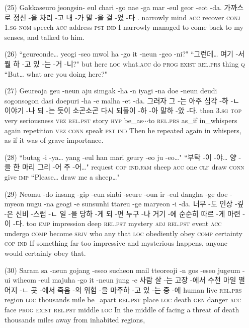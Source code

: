 \begin{itemize}
\item [(25)]
\tgl
		{Gakkaseuro jeongsin- eul chari -go nae -ga mar -eul geor -eot -da.}
		{가까스로 정신 -을 차리 -고 내 -가 말 -을 걸 -었 -다 .}
		{narrowly	mind	\textsc{acc}	recover	\textsc{conj}	\textsc{1.sg}	\textsc{nom}	speech	\textsc{acc}	address	\textsc{pst}	\textsc{ind}}
		{I narrowly managed to come back to my senses, and talked to him.}
		
\item [(26)]
\tgl
		{``geureonde… yeogi -seo mwol ha -go it -neun -geo -ni?"}
		{``그런데… 여기 -서 뭘 하 -고 있 -는 -거 -니?"}
		{but	here	\textsc{loc}	what.\textsc{acc}	do	\textsc{prog}	\textsc{exist}	\textsc{rel.prs}	thing	\textsc{q}	}
		{``But… what are you doing here?"}
		
\item [(27)]
\tgl
		{Geureoja geu -neun aju simgak -ha -n iyagi -na doe -neun deudi sogonsogon dasi doepuri -ha -e malha -et -da.}
		{그러자 그 -는 아주 심각 -하 -ㄴ 이야기 -나 되 -는 듯이 소곤소곤 다시 되풀이 -하 -아 말하 -았 -다.}
		{then	\textsc{3.sg}	\textsc{top}	very	seriousness	\textsc{vbz}	\textsc{rel.pst}	story	\textsc{hyp}	be\_as$\cdots$to	\textsc{rel.prs}	as\_if	in\_whispers	again	repetition	\textsc{vbz}	\textsc{conn}	speak	\textsc{pst}	\textsc{ind}}
		{Then he repeated again in whispers, as if it was of grave importance.}
		
\item [(28)]
\tgl
		{``butag -i -ya… yang -eul han mari geury -eo ju -eo…"}
		{``부탁 -이 -야… 양 -을 한 마리 그리 -어 주 -어…"}
		{request	\textsc{cop}	\textsc{ind.fam}	sheep	\textsc{acc}	one	\textsc{clf}	draw	\textsc{conn}	give	\textsc{imp}}
		{``Please… draw me a sheep…"}
		
\item [(29)]
\tgl
		{Neomu -do insang -gip -eun sinbi -seure -oun ir -eul dangha -ge doe -myeon nugu -na geogi -e sunsunhi ttareu -ge maryeon -i -da.}
		{너무 -도 인상 -깊 -은 신비 -스럽 -ㄴ 일 -을 당하 -게 되 -면 누구 -나 거기 -에 순순히 따르 -게 마련 -이 -다.}
		{too	\textsc{emp}	impression	deep	\textsc{rel.pst}	mystery	\textsc{adj}	\textsc{rel.pst}	event	\textsc{acc}	undergo	\textsc{comp}	become	\textsc{sbjv}	who	any	that	\textsc{loc}	obediently	obey	\textsc{comp}	certainty	\textsc{cop}	\textsc{ind}}
		{If something far too impressive and mysterious happens, anyone would certainly obey that.}
		
\item [(30)]
\tgl
		{Saram sa -neun gojang -eseo sucheon mail tteoreoji -n gos -eseo jugeum -ui wiheom -eul majuha -go it -neun jung -e}
		{사람 살 -는 고장 -에서 수천 마일 떨어지 -ㄴ 곳 -에서 죽음 -의 위험 -을 마주하 -고 있 -는 중 -에}
		{human	live	\textsc{rel.prs}	region	\textsc{loc}	thousands	mile	be\_apart	\textsc{rel.pst}	place	\textsc{loc}	death	\textsc{gen}	danger	\textsc{acc}	face	\textsc{prog}	\textsc{exist}	\textsc{rel.pst}	middle	\textsc{loc}}
		{In the middle of facing a threat of death thousands miles away from inhabited regions,}


\end{itemize}
